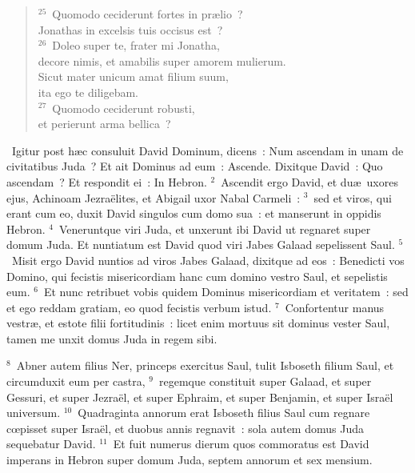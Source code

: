 \begin{flushleft}\begin{verse}${}^{25}$~Quomodo ceciderunt fortes in pr\ae lio~?\\ Jonathas in excelsis tuis occisus est~?\\
${}^{26}$~Doleo super te, frater mi Jonatha,\\ decore nimis, et amabilis super amorem mulierum.\\ Sicut mater unicum amat filium suum,\\ ita ego te diligebam.\\
${}^{27}$~Quomodo ceciderunt robusti,\\ et perierunt arma bellica~?\end{verse}\end{flushleft}


~Igitur post h\ae c consuluit David Dominum, dicens~: Num ascendam in unam de civitatibus Juda~? Et ait Dominus ad eum~: Ascende. Dixitque David~: Quo ascendam~? Et respondit ei~: In Hebron.
${}^{2}$~Ascendit ergo David, et du\ae\ uxores ejus, Achinoam Jezra\"elites, et Abigail uxor Nabal Carmeli~:
${}^{3}$~sed et viros, qui erant cum eo, duxit David singulos cum domo sua~: et manserunt in oppidis Hebron.
${}^{4}$~Veneruntque viri Juda, et unxerunt ibi David ut regnaret super domum Juda. Et nuntiatum est David quod viri Jabes Galaad sepelissent Saul.
${}^{5}$~Misit ergo David nuntios ad viros Jabes Galaad, dixitque ad eos~: Benedicti vos Domino, qui fecistis misericordiam hanc cum domino vestro Saul, et sepelistis eum.
${}^{6}$~Et nunc retribuet vobis quidem Dominus misericordiam et veritatem~: sed et ego reddam gratiam, eo quod fecistis verbum istud.
${}^{7}$~Confortentur manus vestr\ae , et estote filii fortitudinis~: licet enim mortuus sit dominus vester Saul, tamen me unxit domus Juda in regem sibi.


${}^{8}$~Abner autem filius Ner, princeps exercitus Saul, tulit Isboseth filium Saul, et circumduxit eum per castra,
${}^{9}$~regemque constituit super Galaad, et super Gessuri, et super Jezra\"el, et super Ephraim, et super Benjamin, et super Isra\"el universum.
${}^{10}$~Quadraginta annorum erat Isboseth filius Saul cum regnare cœpisset super Isra\"el, et duobus annis regnavit~: sola autem domus Juda sequebatur David.
${}^{11}$~Et fuit numerus dierum quos commoratus est David imperans in Hebron super domum Juda, septem annorum et sex mensium.


